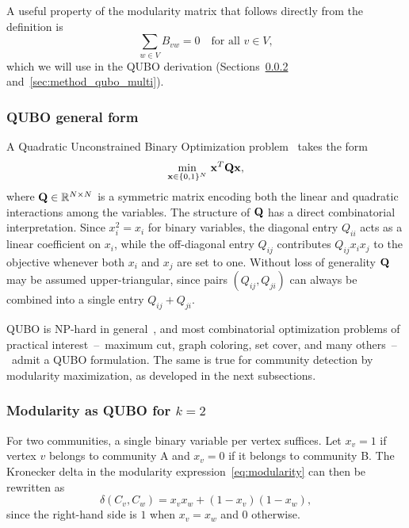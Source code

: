 A useful property of the modularity matrix that follows directly
from the definition is
\begin{equation}
    \sum_{w \in V} B_{vw} = 0 \quad \text{for all } v \in V,
    \label{eq:B_row_sum}
\end{equation}
which we will use in the QUBO derivation
(Sections~\ref{sec:method_qubo_k2}
and~\ref{sec:method_qubo_multi}).

\subsubsection{QUBO general form}
\label{sec:method_qubo_general}

A Quadratic Unconstrained Binary Optimization problem~\cite{lucas2014ising}
takes the form
\begin{equation}
    \min_{\mathbf{x} \in \{0,1\}^N} \, \mathbf{x}^T \mathbf{Q} \mathbf{x},
    \label{eq:qubo_general}
\end{equation}
where $\mathbf{Q} \in \mathbb{R}^{N \times N}$ is a symmetric matrix
encoding both the linear and quadratic interactions among the
variables. The structure of $\mathbf{Q}$ has a direct combinatorial
interpretation. Since $x_i^2 = x_i$ for binary variables, the
diagonal entry $Q_{ii}$ acts as a linear coefficient on $x_i$,
while the off-diagonal entry $Q_{ij}$ contributes $Q_{ij} x_i x_j$
to the objective whenever both $x_i$ and $x_j$ are set to one.
Without loss of generality $\mathbf{Q}$ may be assumed upper-triangular,
since pairs $(Q_{ij}, Q_{ji})$ can always be combined into a single
entry $Q_{ij} + Q_{ji}$.

QUBO is NP-hard in general~\cite{lucas2014ising}, and most
combinatorial optimization problems of practical interest~--~maximum
cut, graph coloring, set cover, and many others~--~admit a QUBO
formulation. The same is true for community detection by modularity
maximization, as developed in the next subsections.


\subsubsection{Modularity as QUBO for $k = 2$}
\label{sec:method_qubo_k2}

For two communities, a single binary variable per vertex suffices.
Let $x_v = 1$ if vertex $v$ belongs to community A and $x_v = 0$
if it belongs to community B. The Kronecker delta in the modularity
expression~\eqref{eq:modularity} can then be rewritten as
\begin{equation}
    \delta(C_v, C_w) = x_v x_w + (1 - x_v)(1 - x_w),
    \label{eq:delta_k2}
\end{equation}
since the right-hand side is $1$ when $x_v = x_w$ and $0$ otherwise.

